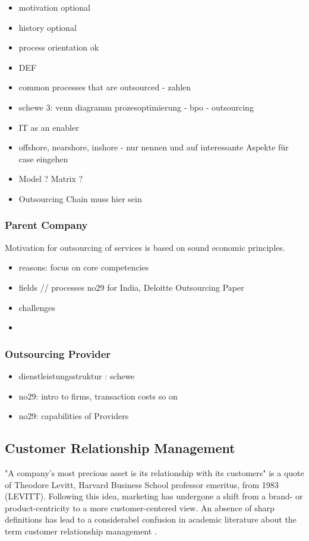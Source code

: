 			
		\begin{itemize}
			\item motivation optional 
			\item history optional
			\item process orientation  ok
			\item DEF
			\item common processes that are outsourced - zahlen
			\item schewe 3: venn diagramm prozesoptimierung - bpo - outsourcing
			
			\item IT as an enabler
			\item offshore, nearshore, inshore - nur nennen und auf interessante Aspekte für case eingehen
			\item Model ? Matrix ? 
			\item Outsourcing Chain muss hier sein 
		\end{itemize}
	
		\subsubsection{Parent Company}
		Motivation for outsourcing of services is based on sound economic principles. 
		\begin{itemize}
			\item reasons: focus on core competencies
			\item fields // processes no29 for India, Deloitte Outsourcing Paper
			\item challenges
			\item 
		\end{itemize}
		\subsubsection{Outsourcing Provider}
		
		\begin{itemize}
			\item dienstleistungsstruktur  : schewe
			\item no29: intro to firms, transaction costs so on
			\item no29: capabilities of Providers
		\end{itemize}
		\subsection{Customer Relationship Management}
		"A company's most precious asset is its relationship with its customers" is a quote of Theodore Levitt, Harvard Business School professor emeritus, from 1983 (LEVITT). Following this idea, marketing has undergone a shift from a brand- or product-centricity to a more customer-centered view. An absence of sharp definitions has lead to a considerabel confusion in academic literature about the term customer relationship management  \cite{paynefrow2005}. 
		
